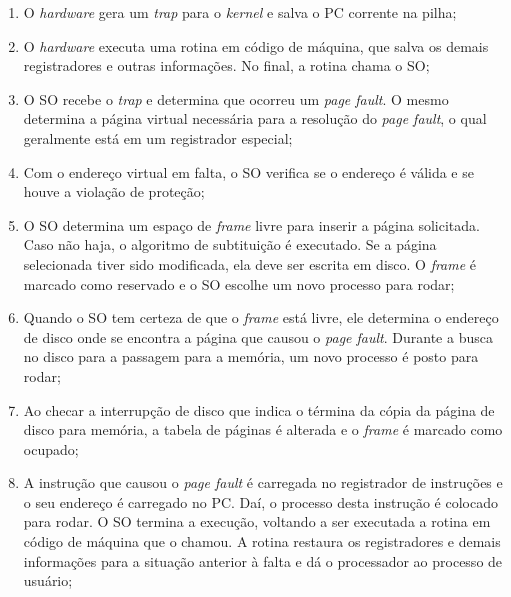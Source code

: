 \begin{enumerate}
  \item O \textit{hardware} gera um \textit{trap} para o \textit{kernel} e salva o PC corrente na pilha;

  \item O \textit{hardware} executa uma rotina em código de máquina, que salva os demais registradores e outras informações. No final, a rotina chama o SO;

  \item O SO recebe o \textit{trap} e determina que ocorreu um \textit{page fault}. O mesmo determina a página virtual necessária para a resolução do \textit{page fault}, o qual geralmente está em um registrador especial;

  \item Com o endereço virtual em falta, o SO verifica se o endereço é válida e se houve a violação de proteção;

  \item O SO determina um espaço de \textit{frame} livre para inserir a página solicitada. Caso não haja, o algoritmo de subtituição é executado. Se a página selecionada tiver sido modificada, ela deve ser escrita em disco. O \textit{frame} é marcado como reservado e o SO escolhe um novo processo para rodar;

  \item Quando o SO tem certeza de que o \textit{frame} está livre, ele determina o endereço de disco onde se encontra a página que causou o \textit{page fault}. Durante a busca no disco para a passagem para a memória, um novo processo é posto para rodar;

  \item Ao checar a interrupção de disco que indica o términa da cópia da página de disco para memória, a tabela de páginas é alterada e o \textit{frame} é marcado como ocupado;

  \item A instrução que causou o \textit{page fault} é carregada no registrador de instruções e o seu endereço é carregado no PC. Daí, o processo desta instrução é colocado para rodar. O SO termina a execução, voltando a ser executada a rotina em código de máquina que o chamou. A rotina restaura os registradores e demais informações para a situação anterior à falta e dá o processador ao processo de usuário;

\end{enumerate}








